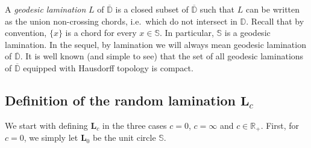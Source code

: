 \documentclass[10pt]{amsart}
\theoremstyle{definition}\newtheorem{defi}[theo]{Definition}\newtheorem{rema}[theo]{Remark}\newtheorem{exam}[theo]{Example}\newtheorem{exem}[theo]{Example}\newtheorem{nota}[theo]{Notation}
\newcommand{\R}{\mathbb{R}}
\newcommand{\D}{\mathbb{D}}
\def\S{\mathbb{S}}
\begin{document}
A \emph{geodesic lamination} $L$ of $\overline{\D}$ is a closed subset of $\overline{\D}$ such that $L$  can be written as the union non-crossing chords, i.e.\ which do not intersect in $\D$.
Recall that by convention, $ \{x\}$ is a chord for every $x \in \S$. In particular, $\S$ is a geodesic lamination. In the sequel, by lamination we will always mean geodesic lamination of $\overline{\D}$.  It is well known (and simple to see) that the set of all geodesic laminations of $\overline{\D}$ equipped with Hausdorff topology is compact.



\subsection{Definition of the random lamination \texorpdfstring{$\mathbf{L}_{c}$}{Lc}}
\label{sec:deflam}


We start with defining $\mathbf{L}_{c}$ in the three cases $c=0$, $c=\infty$ and $c \in \R_{+}$. First, for $c=0$, we simply let $\mathbf{L}_{0}$ be the unit circle $\mathbb{S}$.
\end{document}
